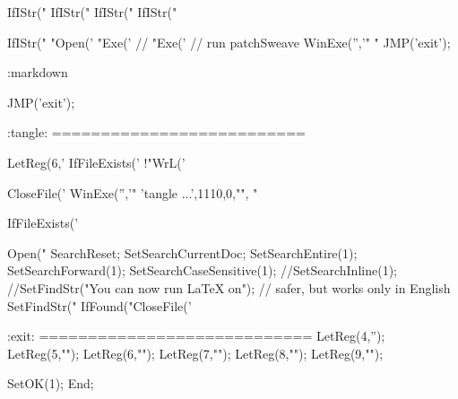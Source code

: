   IfIStr("%
  IfIStr("%
  IfIStr("%
  IfIStr("%


  IfIStr("%
     "Open('%
     "Exe('%
 //     "Exe('%
 // run patchSweave
     WinExe('','"%
         "%
  JMP('exit');

:markdown

  JMP('exit');

:tangle: ==========================

  LetReg(6,'%
  IfFileExists('%
       !"WrL('%

  CloseFile('%
  WinExe('','"%
         'tangle ...',1110,0,"", "%

  IfFileExists('%

  Open("%
 SearchReset;
 SetSearchCurrentDoc;
 SetSearchEntire(1);
 SetSearchForward(1);
 SetSearchCaseSensitive(1);
 //SetSearchInline(1);
  //SetFindStr("You can now run LaTeX on"); // safer, but works only in English
  SetFindStr("%
  IfFound("CloseFile('%


:exit: ============================
  LetReg(4,'');
  LetReg(5,"");
  LetReg(6,"");
  LetReg(7,"");
  LetReg(8,"");
  LetReg(9,"");

  SetOK(1);
End;

